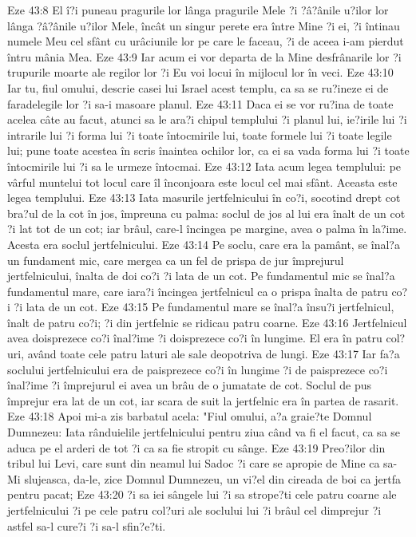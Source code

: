 Eze 43:8  El î?i puneau pragurile lor lânga pragurile Mele ?i ?â?ânile u?ilor lor lânga ?â?ânile u?ilor Mele, încât un singur perete era între Mine ?i ei, ?i întinau numele Meu cel sfânt cu urâciunile lor pe care le faceau, ?i de aceea i-am pierdut întru mânia Mea.
Eze 43:9  Iar acum ei vor departa de la Mine desfrânarile lor ?i trupurile moarte ale regilor lor ?i Eu voi locui în mijlocul lor în veci.
Eze 43:10  Iar tu, fiul omului, descrie casei lui Israel acest templu, ca sa se ru?ineze ei de faradelegile lor ?i sa-i masoare planul.
Eze 43:11  Daca ei se vor ru?ina de toate acelea câte au facut, atunci sa le ara?i chipul templului ?i planul lui, ie?irile lui ?i intrarile lui ?i forma lui ?i toate întocmirile lui, toate formele lui ?i toate legile lui; pune toate acestea în scris înaintea ochilor lor, ca ei sa vada forma lui ?i toate întocmirile lui ?i sa le urmeze întocmai.
Eze 43:12  Iata acum legea templului: pe vârful muntelui tot locul care îl înconjoara este locul cel mai sfânt. Aceasta este legea templului.
Eze 43:13  Iata masurile jertfelnicului în co?i, socotind drept cot bra?ul de la cot în jos, împreuna cu palma: soclul de jos al lui era înalt de un cot ?i lat tot de un cot; iar brâul, care-l încingea pe margine, avea o palma în la?ime. Acesta era soclul jertfelnicului.
Eze 43:14  Pe soclu, care era la pamânt, se înal?a un fundament mic, care mergea ca un fel de prispa de jur împrejurul jertfelnicului, înalta de doi co?i ?i lata de un cot. Pe fundamentul mic se înal?a fundamentul mare, care iara?i încingea jertfelnicul ca o prispa înalta de patru co?i ?i lata de un cot.
Eze 43:15  Pe fundamentul mare se înal?a însu?i jertfelnicul, înalt de patru co?i; ?i din jertfelnic se ridicau patru coarne.
Eze 43:16  Jertfelnicul avea doisprezece co?i înal?ime ?i doisprezece co?i în lungime. El era în patru col?uri, având toate cele patru laturi ale sale deopotriva de lungi.
Eze 43:17  Iar fa?a soclului jertfelnicului era de paisprezece co?i în lungime ?i de paisprezece co?i înal?ime ?i împrejurul ei avea un brâu de o jumatate de cot. Soclul de pus împrejur era lat de un cot, iar scara de suit la jertfelnic era în partea de rasarit.
Eze 43:18  Apoi mi-a zis barbatul acela: "Fiul omului, a?a graie?te Domnul Dumnezeu: Iata rânduielile jertfelnicului pentru ziua când va fi el facut, ca sa se aduca pe el arderi de tot ?i ca sa fie stropit cu sânge.
Eze 43:19  Preo?ilor din tribul lui Levi, care sunt din neamul lui Sadoc ?i care se apropie de Mine ca sa-Mi slujeasca, da-le, zice Domnul Dumnezeu, un vi?el din cireada de boi ca jertfa pentru pacat;
Eze 43:20  ?i sa iei sângele lui ?i sa strope?ti cele patru coarne ale jertfelnicului ?i pe cele patru col?uri ale soclului lui ?i brâul cel dimprejur ?i astfel sa-l cure?i ?i sa-l sfin?e?ti.
